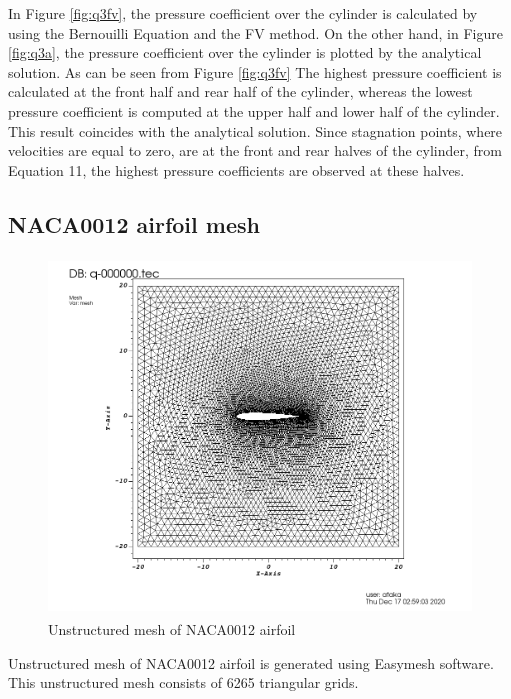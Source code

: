 \documentclass[letterpaper,12pt]{article}
\begin{document}
\newpage
In Figure \ref{fig:q3fv}, the pressure coefficient over the cylinder is calculated by using the 
Bernouilli Equation and the FV method. On the other hand, in Figure \ref{fig:q3a}, the pressure coefficient
over the cylinder is plotted by the analytical solution. As can be seen from Figure \ref{fig:q3fv} 
The highest pressure coefficient is calculated at the front half and rear half of the cylinder, whereas
the lowest pressure coefficient is computed at the upper half and lower half of the cylinder. This result
coincides with the analytical solution. Since stagnation points, where velocities are equal to zero, 
are at the front and rear halves of the cylinder, from Equation 11, the highest pressure
coefficients are observed at these halves.

\subsection{NACA0012 airfoil mesh}
\label{sec:medium}

\begin{figure} [!h]
	\centering
	\includegraphics[height = 9.5cm]{graph/medium/medium_62650000.png}
	\caption{Unstructured mesh of NACA0012 airfoil}
    \label{fig:airfoilmesh}
\end{figure}

\vspace{1cm}

Unstructured mesh of NACA0012 airfoil is generated using Easymesh software. This
unstructured mesh consists of 6265 triangular grids.

\newpage
\end{document}
